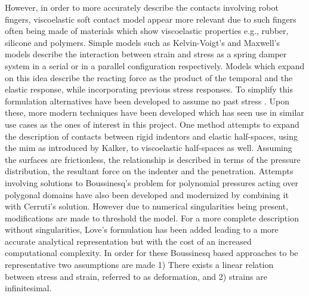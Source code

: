 However, in order to more accurately describe the contacts involving robot fingers, viscoelastic soft contact model appear more relevant due to such fingers often being made of materials which show viscoelastic properties e.g., rubber, silicone and polymers. Simple models such as  Kelvin-Voigt's\cite*{viscoelasticity} and Maxwell's\cite{on-the-dynamical-theory-of-gases} models describe the interaction between strain and stress as a spring damper system in a serial or in a parallel configuration respectively. Models which expand on this idea describe the reacting force as the product of the temporal and the elastic response, while incorporating previous stress responses\cite{mechanical-properties-and-active-remodeling-of-blood-vessels}. To simplify this formulation alternatives have been developed to assume no past stress \cite{modeling-of-viscoelastic-contacts-and-evolution-of-limit-surface-for-robotic-contact-interface}\cite*{characteristics-of-contact-and-limit-surface-for-viscoelastic-fingers}\cite*{effect-of-layer-compliance-on-frictional-behavior-of-soft-robotic-fingers}. Upon these, more modern techniques have been developed which has seen use in similar use cases as the ones of interest in this project. 
One method attempts to expand the description of contacts between rigid indentors and elastic half-spaces, using the \gls{mim} as introduced by Kalker\cite*{on-the-contact-problem-in-elastostatics}, to viscoelastic half-spaces as well. Assuming the surfaces are frictionless, the relationship is described in terms of the pressure distribution, the resultant force on the indenter and the penetration\cite*{a-new-algorithm-for-computing-the-indentation-of-a-rigid-body-of-arbitrary-shape-on-a-viscoelastic-half-space}.
Attempts involving solutions to Boussinesq's problem for polynomial pressures acting over polygonal domains\cite*{a-general-approach-to-the-solution-of-boussinesqs-problem-for-polynomial-pressures-acting-over-polygonal-domains} have also been developed and modernized by combining it with Cerruti's solution\cite*{a-boussinesq-cerruti-solution-set-for-constant-and-linear-distribution-of-normal-and-tangential-load-over-a-triangular-area}. However due to numerical singularities being present, modifications are made to threshold the model. For a more complete description without singularities, Love's formulation has been added leading to a more accurate analytical representation but with the cost of an increased computational complexity\cite*{contact-modelling-and-tactile-data-processing-for-robot-skins}. In order for these Boussinesq based approaches to be representative two assumptions are made 1) There exists a linear relation between stress and strain, referred to as deformation, and 2) strains are infinitesimal\cite[Chapter 6]{the-linearized-theory-of-elasticity}. \medskip

